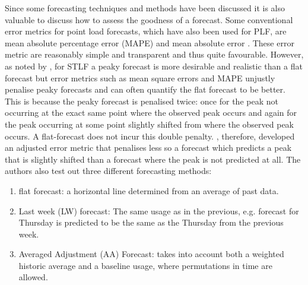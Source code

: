 %
%
%



Since some forecasting techniques and methods have been discussed it is also valuable to discuss how to assess the goodness of a forecast. Some conventional error metrics for point load forecasts, which have also been used for PLF, are mean absolute percentage error (MAPE) and mean absolute error \citep{hong16}. These error metric are reasonably simple and transparent and thus quite favourable. However, as noted by \cite{dan14}, for STLF a peaky forecast is more desirable and realistic than a flat forecast but error metrics such as mean square errors and MAPE unjustly penalise peaky forecasts and can often quantify the flat forecast to be better. This is because the peaky forecast is penalised twice: once for the peak not occurring at the exact same point where the observed peak occurs and again for the peak occurring at some point slightly shifted from where the observed peak occurs. A flat-forecast does not incur this double penalty. \citet{dan14}, therefore, developed an adjusted error metric that penalises less so a forecast which predicts a peak that is slightly shifted than a forecast where the peak is not predicted at all. The authors also test out three different forecasting methods:
\begin{enumerate}
\item flat forecast: a horizontal line determined from an average of past data.
\item Last week (LW) forecast: The same usage as in the previous, e.g. forecast for Thursday is predicted to be the same as the Thursday from the previous week.
\item Averaged Adjustment (AA) Forecast: takes into account both a weighted historic average and a baseline usage, where permutations in time are allowed.
\end{enumerate}


